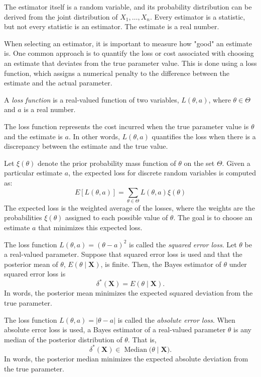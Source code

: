 The estimator itself is a random variable, and its probability distribution can be derived from the joint distribution of $X_1, \ldots, X_n$. Every estimator is a statistic, but not every statistic is an estimator. The estimate is a real number.

When selecting an estimator, it is important to measure how "good" an estimate is. One common approach is to quantify the loss or cost associated with choosing an estimate that deviates from the true parameter value. This is done using a loss function, which assigns a numerical penalty to the difference between the estimate and the actual parameter.

\begin{definition}
A \emph{loss function} is a real-valued function of two variables, $L\left(\theta,a\right)$, where $\theta \in \Theta$ and $a$ is a real number.
\end{definition}

The loss function represents the cost incurred when the true parameter value is $\theta$ and the estimate is $a$. In other words, $L\left(\theta,a\right)$ quantifies the loss when there is a discrepancy between the estimate and the true value.

Let $\xi\left(\theta\right)$ denote the prior probability mass function of $\theta$ on the set $\Theta$. Given a particular estimate $a$, the expected loss for discrete random variables is computed as:
\[
E\left[L\left(\theta,a\right)\right]=\sum_{\theta \in \Theta} L\left(\theta,a\right)\xi\left(\theta\right)
\]
The expected loss is the weighted average of the losses, where the weights are the probabilities $\xi(\theta)$ assigned to each possible value of $\theta$. The goal is to choose an estimate $a$ that minimizes this expected loss.

\begin{example}
The loss function $L\left(\theta,a\right) = (\theta-a)^2$ is called the \emph{squared error loss}. Let $\theta$ be a real-valued parameter. Suppose that squared error loss is used and that the posterior mean of $\theta$, $E(\theta \mid \mathbf{X})$, is finite. Then, the Bayes estimator of $\theta$ under squared error loss is
\[
\delta^\ast(\mathbf{X}) = E(\theta \mid \mathbf{X}).
\]
In words, the posterior mean minimizes the expected squared deviation from the true parameter.

The loss function $L\left(\theta,a\right) = \lvert \theta-a \rvert$ is called the \emph{absolute error loss}. When absolute error loss is used, a Bayes estimator of a real-valued parameter $\theta$ is any median of the posterior distribution of $\theta$. That is,
\[
\delta^\ast(\mathbf{X}) \in \operatorname{Median}\big(\theta \mid \mathbf{X}\big).
\]
In words, the posterior median minimizes the expected absolute deviation from the true parameter.
\end{example}

